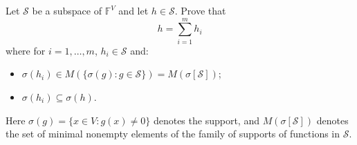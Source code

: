 Let $\mathcal{S}$ be a subspace of $\mathbb{F}^V$ and let $h \in \mathcal{S}$. Prove that
$$h = \sum_{i=1}^{m} h_i$$
where for $i = 1, \ldots, m$, $h_i \in \mathcal{S}$ and:
\begin{itemize}
  \item[(a)] $\sigma(h_i) \in M(\{\sigma(g): g \in \mathcal{S}\}) = M(\sigma[\mathcal{S}])$;
  \item[(b)] $\sigma(h_i) \subseteq \sigma(h)$.
\end{itemize}
Here $\sigma(g) = \{x \in V : g(x) \neq 0\}$ denotes the support, and $M(\sigma[\mathcal{S}])$ denotes the set of minimal nonempty elements of the family of supports of functions in $\mathcal{S}$.
